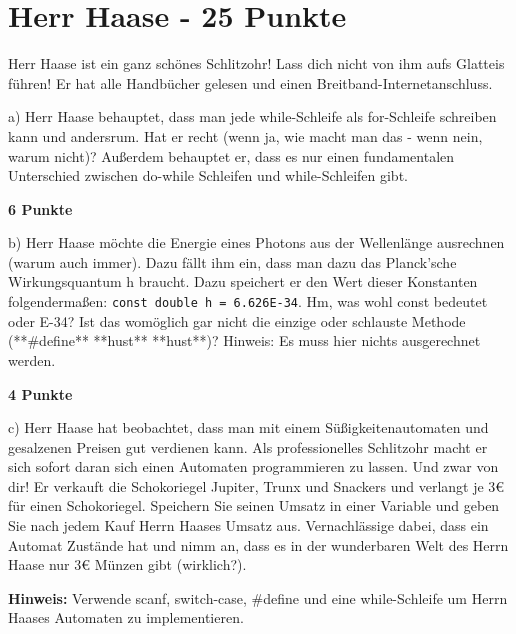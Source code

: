 \documentclass{article}
\begin{document}
\bigskip

\section{Herr Haase - 25 Punkte}

Herr Haase ist ein ganz schönes Schlitzohr! Lass dich nicht von ihm aufs Glatteis führen! Er hat alle Handbücher gelesen und einen Breitband-Internetanschluss.

\bigskip

a) Herr Haase behauptet, dass man jede while-Schleife als for-Schleife schreiben kann und andersrum. Hat er recht (wenn ja, wie macht man das - wenn nein, warum nicht)? Außerdem behauptet er, dass es nur einen fundamentalen Unterschied zwischen do-while Schleifen und while-Schleifen gibt.

\begin{flushright}
	\textbf{6 Punkte}
\end{flushright}

\bigskip

b) Herr Haase möchte die Energie eines Photons aus der Wellenlänge ausrechnen (warum auch immer). Dazu fällt ihm ein, dass man dazu das Planck'sche Wirkungsquantum h braucht. Dazu speichert er den Wert dieser Konstanten folgendermaßen: \texttt{const double h = 6.626E-34}. Hm, was wohl const bedeutet oder E-34? Ist das womöglich gar nicht die einzige oder schlauste Methode (**\#define** **hust** **hust**)? Hinweis: Es muss hier nichts ausgerechnet werden. 

\begin{flushright}
	\textbf{4 Punkte}
\end{flushright} 

\bigskip

c) Herr Haase hat beobachtet, dass man mit einem Süßigkeitenautomaten und gesalzenen Preisen gut verdienen kann. Als professionelles Schlitzohr macht er sich sofort daran sich einen Automaten programmieren zu lassen. Und zwar von dir! Er verkauft die Schokoriegel Jupiter, Trunx und Snackers und verlangt je 3€ für einen Schokoriegel. Speichern Sie seinen Umsatz in einer Variable und geben Sie nach jedem Kauf Herrn Haases Umsatz aus. Vernachlässige dabei, dass ein Automat Zustände hat und nimm an, dass es in der wunderbaren Welt des Herrn Haase nur 3€ Münzen gibt (wirklich?).

\bigskip

\textbf{Hinweis: }Verwende scanf, switch-case, \#define und eine while-Schleife um Herrn Haases Automaten zu implementieren.
\end{document}
